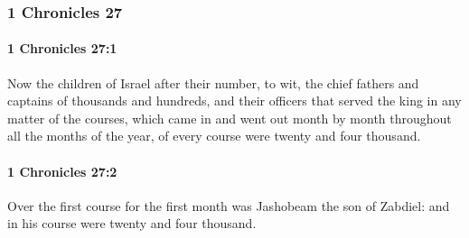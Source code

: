 	\subsubsection{1 Chronicles 27} %
		\label{1CHRONICLES-27}

		\paragraph{1 Chronicles 27:1} %
			\label{1CHRONICLES-27-1}

			Now the children of Israel after their number, to wit, the chief fathers and captains of thousands and hundreds, and their officers that served the king in any matter of the courses, which came in and went out month by month throughout all the months of the year, of every course were twenty and four thousand.


		\paragraph{1 Chronicles 27:2} %
			\label{1CHRONICLES-27-2}

			Over the first course for the first month was Jashobeam the son of Zabdiel: and in his course were twenty and four thousand.

